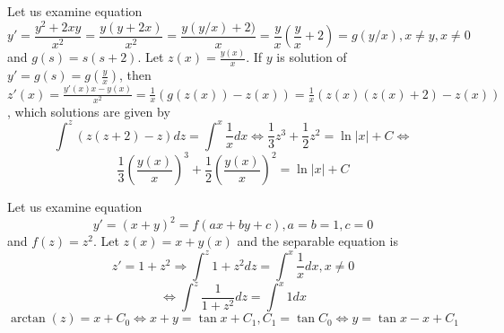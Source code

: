 \begin{example}
Let us examine equation
\[
  y' = \frac{y^2 + 2 x y}{x^2} = \frac{y(y + 2x)}{x^2} = \frac{y(y/x) + 2)}{x}
  = \frac{y}{x} (\frac{y}{x} + 2) = g(y/x), x \neq y, x \neq 0
\]
and $g(s) = s(s + 2)$. Let $z(x) = \frac{y(x)}{x}$. If $y$ is solution of $y' =
g(s) = g(\frac{y}{x})$, then $z'(x) = \frac{y'(x) x - y(x)}{x^2} = \frac{1}{x}
(g(z(x)) - z(x)) = \frac{1}{x} (z(x) (z(x) + 2) - z(x))$, which solutions are
given by
\[
  \int^z (z (z + 2) - z) dz = \int^x \frac{1}{x} dx \Leftrightarrow
  \frac{1}{3} z^3 + \frac{1}{2} z^2 = \ln |x| + C \Leftrightarrow
\]
\[
  \frac{1}{3} (\frac{y(x)}{x})^3 + \frac{1}{2} (\frac{y(x)}{x})^2 = \ln |x| + C
\]
\end{example}
\begin{example}
Let us examine equation
\[
  y' = (x + y)^2 = f(ax + by + c), a = b = 1, c = 0
\]
and $f(z) = z^2$. Let $z(x) = x + y(x)$ and the separable equation is
\[
  z' = 1 + z^2 \Rightarrow \int^z 1 + z^2 dz = \int^x \frac{1}{x} dx, x \neq 0
\]
\[
  \Leftrightarrow \int^z \frac{1}{1 + z^2} dz = \int^x 1 dx
\]
\[
  \arctan(z) = x + C_0 \Leftrightarrow x + y = \tan x + C_1, C_1 = \tan C_0
  \Leftrightarrow y = \tan x - x + C_1
\]
\end{example}
